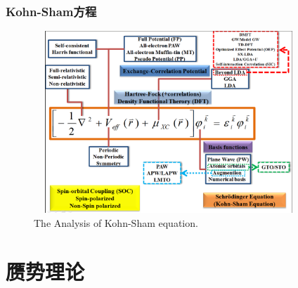 \small
\frame                               %
{
	\frametitle{\textrm{Kohn-Sham}方程}
\begin{figure}[h!]
\centering
\vspace*{-0.21in}
\hspace*{-0.1in}
\includegraphics[height=2.7in,width=4.0in,viewport=2 5 1162 880,clip]{Figures/DFT.png}
\caption{\tiny \textrm{The Analysis of Kohn-Sham equation.}}%
\label{DFT}
\end{figure}
}

\section{赝势理论}       %
